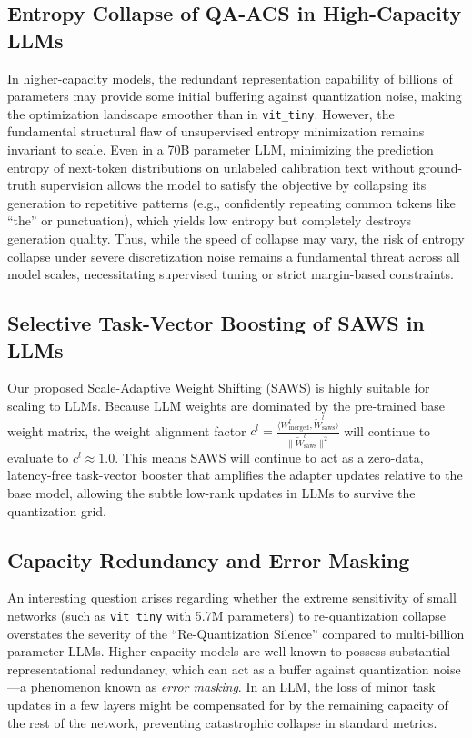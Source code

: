 \documentclass{article}
\theoremstyle{plain}
\theoremstyle{definition}
\theoremstyle{remark}
\begin{document}
\subsection{Entropy Collapse of QA-ACS in High-Capacity LLMs}
In higher-capacity models, the redundant representation capability of billions of parameters may provide some initial buffering against quantization noise, making the optimization landscape smoother than in \texttt{vit\_tiny}. However, the fundamental structural flaw of unsupervised entropy minimization remains invariant to scale. Even in a 70B parameter LLM, minimizing the prediction entropy of next-token distributions on unlabeled calibration text without ground-truth supervision allows the model to satisfy the objective by collapsing its generation to repetitive patterns (e.g., confidently repeating common tokens like ``the'' or punctuation), which yields low entropy but completely destroys generation quality. Thus, while the speed of collapse may vary, the risk of entropy collapse under severe discretization noise remains a fundamental threat across all model scales, necessitating supervised tuning or strict margin-based constraints.

\subsection{Selective Task-Vector Boosting of SAWS in LLMs}
Our proposed Scale-Adaptive Weight Shifting (SAWS) is highly suitable for scaling to LLMs. Because LLM weights are dominated by the pre-trained base weight matrix, the weight alignment factor $c^l = \frac{\langle W^l_{\text{merged}}, \tilde{W}^l_{\text{saws}} \rangle}{\|\tilde{W}^l_{\text{saws}}\|^2}$ will continue to evaluate to $c^l \approx 1.0$. This means SAWS will continue to act as a zero-data, latency-free task-vector booster that amplifies the adapter updates relative to the base model, allowing the subtle low-rank updates in LLMs to survive the quantization grid.

\subsection{Capacity Redundancy and Error Masking}
An interesting question arises regarding whether the extreme sensitivity of small networks (such as \texttt{vit\_tiny} with 5.7M parameters) to re-quantization collapse overstates the severity of the ``Re-Quantization Silence'' compared to multi-billion parameter LLMs. Higher-capacity models are well-known to possess substantial representational redundancy, which can act as a buffer against quantization noise---a phenomenon known as \emph{error masking}. In an LLM, the loss of minor task updates in a few layers might be compensated for by the remaining capacity of the rest of the network, preventing catastrophic collapse in standard metrics. 
\end{document}
